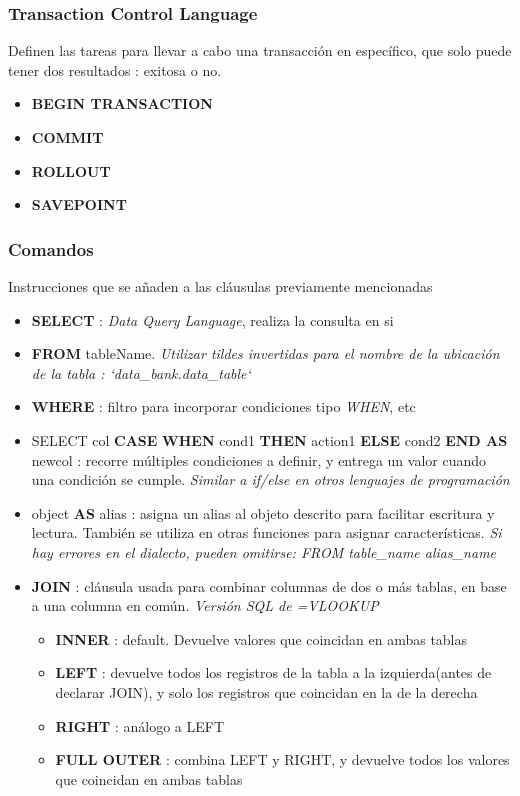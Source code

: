 \subsubsection{Transaction Control Language}
Definen las tareas para llevar a cabo una transacción en específico, que solo puede tener dos resultados : exitosa o no. 
\begin{itemize}
    \item {\textbf{BEGIN TRANSACTION}}
    \item {\textbf{COMMIT}}
    \item {\textbf{ROLLOUT}}
    \item {\textbf{SAVEPOINT}}
\end{itemize}

\subsubsection{Comandos}
Instrucciones que se añaden a las cláusulas previamente mencionadas
\begin{itemize}
    \item {\textbf{SELECT} : \textit{Data Query Language}, realiza la consulta en si}
    \item {\textbf{FROM} tableName. \textit{Utilizar tildes invertidas para el nombre de la ubicación de la tabla : `data\_bank.data\_table`}}
    \item {\textbf{WHERE} : filtro para incorporar condiciones tipo \textit{WHEN}, etc}
    \item {SELECT col \textbf{CASE} \textbf{WHEN} cond1 \textbf{THEN} action1 \textbf{ELSE} cond2 \textbf{END AS} newcol : recorre múltiples condiciones a definir, y entrega un valor cuando una condición se cumple. \textit{Similar a if/else en otros lenguajes de programación}}
    \item {object \textbf{AS} alias : asigna un alias al objeto descrito para facilitar escritura y lectura. También se utiliza en otras funciones para asignar características. \textit{Si hay errores en el dialecto, pueden omitirse: FROM table\_name alias\_name}}
    \item {\textbf{JOIN} : cláusula usada para combinar columnas de dos o más tablas, en base a una columna en común. \textit{Versión SQL de =VLOOKUP}
    \begin{itemize}
        \item {\textbf{INNER} : default. Devuelve valores que coincidan en ambas tablas}
        \item {\textbf{LEFT} : devuelve todos los registros de la tabla a la izquierda(antes de declarar JOIN), y solo los registros que coincidan en la de la derecha}
        \item {\textbf{RIGHT} : análogo a LEFT}
        \item {\textbf{FULL OUTER} : combina LEFT y RIGHT, y devuelve todos los valores que coincidan en ambas tablas}
    \end{itemize}}
\end{itemize}

